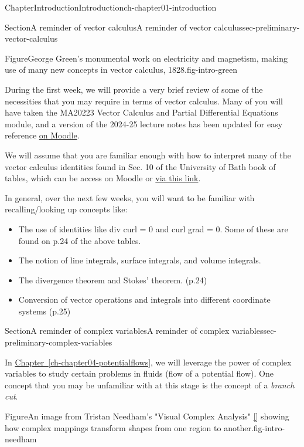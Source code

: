 \documentclass[oneside,10pt,]{book}
\newcommand{\xreffont}{\relax}
\numberwithin{equation}{section}
\begin{document}
\begin{chapterptx}{Chapter}{Introduction}{}{Introduction}{}{}{ch-chapter01-introduction}
\begin{sectionptx}{Section}{A reminder of vector calculus}{}{A reminder of vector calculus}{}{}{sec-preliminary-vector-calculus}
\begin{figureptx}{Figure}{George Green's monumental work on electricity and magnetism, making use of many new concepts in vector calculus, 1828.}{fig-intro-green}{}
\begin{image}{0.25}{0.5}{0.25}{}
\end{image}%
\tcblower
\end{figureptx}%
During the first week, we will provide a very brief review of some of the necessities that you may require in terms of vector calculus. Many of you will have taken the MA20223 Vector Calculus and Partial Differential Equations module, and a version of the 2024-25 lecture notes has been updated for easy reference \href{https://moodle.bath.ac.uk/course/view.php?id=62758}{on Moodle}.%
\par
We will assume that you are familiar enough with how to interpret many of the vector calculus identities found in Sec. 10 of the University of Bath book of tables, which can be access on Moodle or \href{https://people.bath.ac.uk/ensdasr/ME10304.bho/UniBathFormulaeAndStatisticalTables.pdf}{via this link}.%
\par
In general, over the next few weeks, you will want to be familiar with recalling\slash{}looking up concepts like:%
\begin{itemize}[label=\textbullet]
\item{}The use of identities like div curl = 0 and curl grad = 0. Some of these are found on p.24 of the above tables.%
\item{}The notion of line integrals, surface integrals, and volume integrals.%
\item{}The divergence theorem and Stokes' theorem. (p.24)%
\item{}Conversion of vector operations and integrals into different coordinate systems (p.25)%
\end{itemize}
%
\end{sectionptx}
%
%
\typeout{************************************************}
\typeout{************************************************}
%
\begin{sectionptx}{Section}{A reminder of complex variables}{}{A reminder of complex variables}{}{}{sec-preliminary-complex-variables}
\begin{introduction}{}%
In \hyperref[ch-chapter04-potentialflows]{Chapter~{\xreffont\ref{ch-chapter04-potentialflows}}}, we will leverage the power of complex variables to study certain problems in fluids (flow of a potential flow). One concept that you may be unfamiliar with at this stage is the concept of a \emph{branch cut}.%
\begin{figureptx}{Figure}{An image from Tristan Needham's "Visual Complex Analysis" \hyperlink{ref-needham}{[{\xreffont 5}]} showing how complex mappings transform shapes from one region to another.}{fig-intro-needham}{}%

\end{figureptx}
\end{introduction}
\end{sectionptx}
\end{chapterptx}
\end{document}
